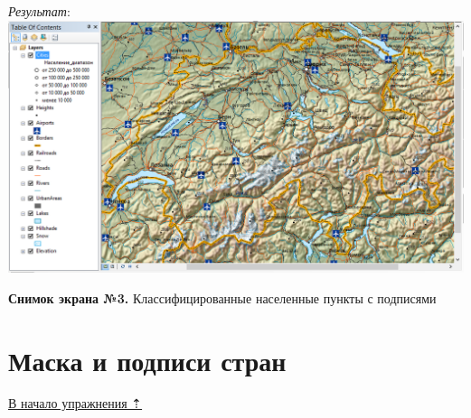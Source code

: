\documentclass[]{book}
\theoremstyle{definition}
\theoremstyle{definition}
\theoremstyle{definition}
\theoremstyle{remark}
\begin{document}
\begin{enumerate}
  \emph{Результат}: \includegraphics{images/Ex02/image22.png}
\end{enumerate}

\textbf{Снимок экрана №3.} Классифицированные населенные пункты с
подписями

\hypertarget{map-design-general-mask}{%
\section{Маска и подписи стран}\label{map-design-general-mask}}

\protect\hyperlink{map-design-general}{В начало упражнения ⇡}
\end{document}

